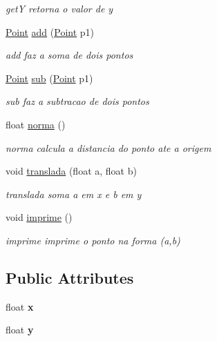 \begin{DoxyCompactItemize}
\begin{DoxyCompactList}\small\item\em getY retorna o valor de y \end{DoxyCompactList}\item 
\hyperlink{classPoint}{Point} \hyperlink{classPoint_a9dbea84b07b0a8ec3bbb9e58b3d15899}{add} (\hyperlink{classPoint}{Point} p1)
\begin{DoxyCompactList}\small\item\em add faz a soma de dois pontos \end{DoxyCompactList}\item 
\hyperlink{classPoint}{Point} \hyperlink{classPoint_a9cf2c53b0a4e6282a6712824bb4e9b00}{sub} (\hyperlink{classPoint}{Point} p1)
\begin{DoxyCompactList}\small\item\em sub faz a subtracao de dois pontos \end{DoxyCompactList}\item 
float \hyperlink{classPoint_abd2618d1f505d9392893273a66e7c9b2}{norma} ()
\begin{DoxyCompactList}\small\item\em norma calcula a distancia do ponto ate a origem \end{DoxyCompactList}\item 
void \hyperlink{classPoint_ad9676e36f3444534b609e3c68422239a}{translada} (float a, float b)
\begin{DoxyCompactList}\small\item\em translada soma a em x e b em y \end{DoxyCompactList}\item 
void \hyperlink{classPoint_a1fb5c2501c27ab2cbc99d06c2a26a741}{imprime} ()\hypertarget{classPoint_a1fb5c2501c27ab2cbc99d06c2a26a741}{}\label{classPoint_a1fb5c2501c27ab2cbc99d06c2a26a741}

\begin{DoxyCompactList}\small\item\em imprime imprime o ponto na forma (a,b) \end{DoxyCompactList}\end{DoxyCompactItemize}
\subsection*{Public Attributes}
\begin{DoxyCompactItemize}
\item 
float {\bfseries x}\hypertarget{classPoint_a05dfe2dfbde813ad234b514f30e662f1}{}\label{classPoint_a05dfe2dfbde813ad234b514f30e662f1}

\item 
float {\bfseries y}\hypertarget{classPoint_a6101960c8d2d4e8ea1d32c9234bbeb8d}{}\label{classPoint_a6101960c8d2d4e8ea1d32c9234bbeb8d}

\end{DoxyCompactItemize}


